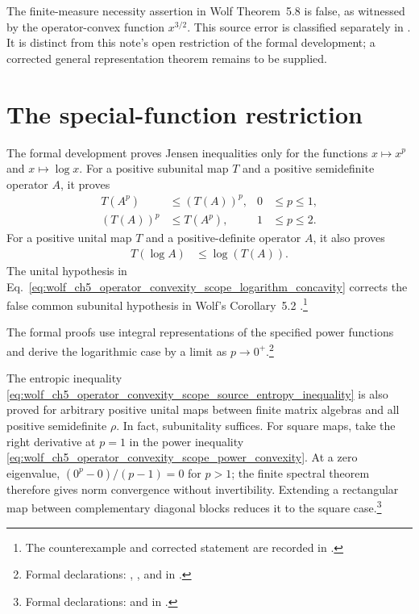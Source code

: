 \documentclass{article}
\begin{document}
The finite-measure necessity assertion in Wolf Theorem~5.8 is false,
as witnessed by the operator-convex function $x^{3/2}$. This source error is
classified separately in \cite{gap:wolf_ch5_finite_measure_representation}.
It is distinct from this note's open restriction of the formal development;
a corrected general representation theorem remains to be supplied.

\section{The special-function restriction}

The formal development proves Jensen inequalities only for the functions
$x\mapsto x^p$ and $x\mapsto\log x$. For a positive subunital map $T$ and a
positive semidefinite operator $A$, it proves
\begin{align}
    T(A^p)&\leq(T(A))^p,
    &
    0&\leq p\leq 1,
    \label{eq:wolf_ch5_operator_convexity_scope_power_concavity}\\
    (T(A))^p&\leq T(A^p),
    &
    1&\leq p\leq 2.
    \label{eq:wolf_ch5_operator_convexity_scope_power_convexity}
\end{align}
For a positive unital map $T$ and a positive-definite operator $A$, it also
proves
\begin{align}
    T(\log A)&\leq\log(T(A)).
    \label{eq:wolf_ch5_operator_convexity_scope_logarithm_concavity}
\end{align}
The unital hypothesis in
Eq.~\ref{eq:wolf_ch5_operator_convexity_scope_logarithm_concavity} corrects
the false common subunital hypothesis in Wolf's Corollary~5.2
\cite[Corollary~5.2]{Wolf2012Quantum}.\footnote{The counterexample and
corrected statement are recorded in
.}

The formal proofs use integral representations of the specified power
functions and derive the logarithmic case by a limit as $p\to 0^+$.\footnote{
Formal declarations:
,
, and
 in
.}

The entropic inequality
\ref{eq:wolf_ch5_operator_convexity_scope_source_entropy_inequality} is also
proved for arbitrary positive unital maps between finite matrix algebras and
all positive semidefinite $\rho$. In fact, subunitality suffices. For square
maps, take the right derivative at $p=1$ in the power inequality
\ref{eq:wolf_ch5_operator_convexity_scope_power_convexity}. At a zero
eigenvalue, $(0^p-0)/(p-1)=0$ for $p>1$; the finite spectral theorem therefore
gives norm convergence without invertibility. Extending a rectangular map
between complementary diagonal blocks reduces it to the square case.\footnote{
Formal declarations:
 and
 in
.}
\end{document}
